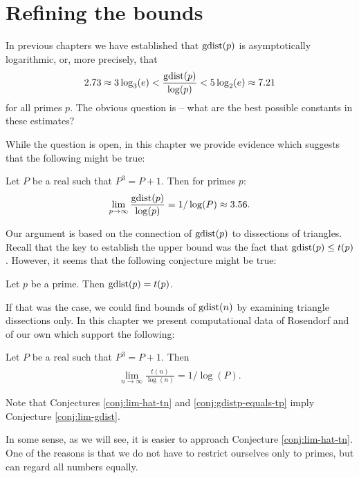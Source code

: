 \chapter{Refining the bounds}
\label{chap:bounds}

In previous chapters we have established that $\mathop{\mathrm{gdist}}(p)$ is asymptotically logarithmic, or, more precisely, that
\begin{align}
	2.73 \approx 3 \log_3(e) < \frac{\mathop{\mathrm{gdist}}(p)}{\log(p)} < 5 \log_2(e) \approx 7.21
\end{align}
for all primes $p$. The obvious question is -- what are the best possible constants in these estimates?

While the question is open, in this chapter we provide evidence which suggests that the following might be true:

\begin{conj}
\label{conj:lim-gdist}
Let $P$ be a real such that $P^3=P+1$. Then for primes $p$:
\begin{align}
	\lim_{p \rightarrow \infty} \frac{\mathop{\mathrm{gdist}}(p)}{\log(p)} = 1/\log(P) \approx 3.56.
\end{align}
\end{conj}%

Our argument is based on the connection of $\mathop{\mathrm{gdist}}(p)$ to dissections of triangles. Recall that the key to establish the upper bound was the fact that $\mathop{\mathrm{gdist}}(p) \leq t(p)$. However, it seems that the following conjecture might be true:

\begin{conj}
\label{conj:gdistp-equals-tp}
Let $p$ be a prime. Then $\mathop{\mathrm{gdist}}(p) = t(p)$.
\end{conj}%

If that was the case, we could find bounds of $\mathop{\mathrm{gdist}}(n)$ by examining triangle dissections only. In this chapter we present computational data of Rosendorf \cite{Rosendorf04} and of our own which support the following:

\begin{conj}
\label{conj:lim-hat-tn}
Let $P$ be a real such that $P^3=P+1$. Then
\begin{align}
	\lim_{n \rightarrow \infty} \frac{\hat t(n)}{\log(n)} = 1/\log(P).
\end{align}
\end{conj}%

Note that Conjectures \ref{conj:lim-hat-tn} and \ref{conj:gdistp-equals-tp} imply Conjecture \ref{conj:lim-gdist}.

In some sense, as we will see, it is easier to approach Conjecture \ref{conj:lim-hat-tn}. One of the reasons is that we do not have to restrict ourselves only to primes, but can regard all numbers equally.

